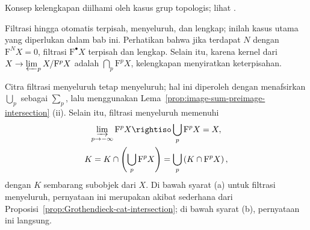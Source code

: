 Konsep kelengkapan diilhami oleh kasus grup topologis; lihat
\cite[\S 4.10]{Li1}.

Filtrasi hingga otomatis terpisah, menyeluruh, dan lengkap; inilah kasus utama
yang diperlukan dalam bab ini. Perhatikan bahwa jika terdapat $N$ dengan
$\mathrm{F}^NX=0$, filtrasi $\mathrm{F}^\bullet X$ terpisah dan lengkap.
Selain itu, karena kernel dari
$X\to\varprojlim_pX/\mathrm{F}^pX$ adalah
$\bigcap_p\mathrm{F}^pX$, kelengkapan menyiratkan keterpisahan.

Citra filtrasi menyeluruh tetap menyeluruh; hal ini diperoleh dengan
menafsirkan $\bigcup_p$ sebagai $\sum_p$, lalu menggunakan
Lema~\ref{prop:image-sum-preimage-intersection} (ii).
Selain itu, filtrasi menyeluruh memenuhi
\begin{equation}\label{eqn:exhaustion-intersection}\begin{gathered}
	\varinjlim_{p \to -\infty} \mathrm{F}^p X \rightiso \bigcup_p \mathrm{F}^p X = X, \\
	K = K \cap \left( \bigcup_p \mathrm{F}^p X \right) = \bigcup_p \left( K \cap \mathrm{F}^p X \right),
\end{gathered}\end{equation}
dengan $K$ sembarang subobjek dari $X$. Di bawah syarat (a) untuk filtrasi
menyeluruh, pernyataan ini merupakan akibat sederhana dari
Proposisi~\ref{prop:Grothendieck-cat-intersection}; di bawah syarat (b),
pernyataan ini langsung.

